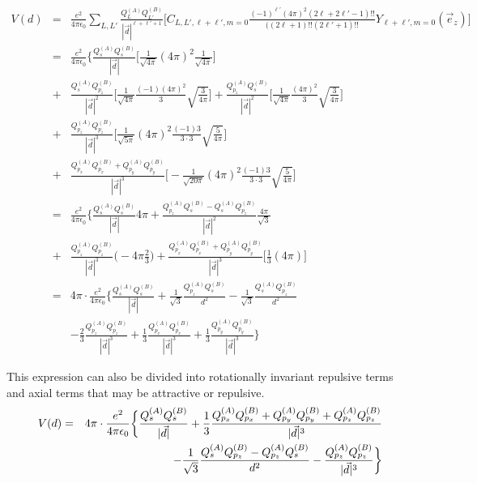\documentclass[11pt,a4paper]{report}
\begin{document}
\begin{eqnarray*}
V(d)&=&
\frac{e^2}{4\pi\epsilon_0} \sum_{L,L'} \frac{ Q_L^{(A)}Q_{L'}^{(B)}}{|\vec{d}|^{\ell+\ell'+1}}
\biggl[C_{L,L',\ell+\ell',m=0}
\frac{(-1)^{\ell'}(4\pi)^2(2\ell+2\ell'-1)!!}{((2\ell+1)!!(2\ell'+1)!!}
Y_{\ell+\ell',m=0}(\vec{e}_z)
\biggr]
\\
&=&
\frac{e^2}{4\pi\epsilon_0}\biggl\lbrace 
\frac{ Q_s^{(A)}Q_{s}^{(B)}}{|\vec{d}|}\biggl[\frac{1}{\sqrt{4\pi}}(4\pi)^2\frac{1}{\sqrt{4\pi}}\biggr]
\\
&+&\frac{ Q_s^{(A)}Q_{p_z}^{(B)}}{|\vec{d}|^{2}}
\biggl[\frac{1}{\sqrt{4\pi}}\frac{(-1)(4\pi)^2}{3}\sqrt{\frac{3}{4\pi}}\biggr]
+\frac{ Q_{p_z}^{(A)}Q_{s}^{(B)}}{|\vec{d}|^{2}}
\biggl[\frac{1}{\sqrt{4\pi}}\frac{(4\pi)^2}{3}\sqrt{\frac{3}{4\pi}}\biggr]
\\
&+&\frac{ Q_{p_z}^{(A)}Q_{p_z}^{(B)}}{|\vec{d}|^3}\biggl[\frac{1}{\sqrt{5\pi}}(4\pi)^2\frac{(-1)3}{3\cdot3}
\sqrt{\frac{5}{4\pi}}\biggr]
\\
&+&\frac{ Q_{p_x}^{(A)}Q_{p_x}^{(B)}+Q_{p_y}^{(A)}Q_{p_y}^{(B)}}{|\vec{d}|^3}
\biggl[-\frac{1}{\sqrt{20\pi}}(4\pi)^2\frac{(-1)3}{3\cdot3}
\sqrt{\frac{5}{4\pi}}\biggr]
\\
&=&
\frac{e^2}{4\pi\epsilon_0}\biggl\lbrace 
\frac{ Q_s^{(A)}Q_{s}^{(B)}}{|\vec{d}|} 4\pi
+\frac{Q_{p_z}^{(A)}Q_{s}^{(B)}- Q_s^{(A)}Q_{p_z}^{(B)}}{|\vec{d}|^{2}}
\frac{4\pi}{\sqrt{3}} 
\\
&+&\frac{ Q_{p_z}^{(A)}Q_{p_z}^{(B)}}{|\vec{d}|^3}\biggl( -4\pi\frac{2}{3}\biggr)
+\frac{ Q_{p_x}^{(A)}Q_{p_x}^{(B)}+Q_{p_y}^{(A)}Q_{p_y}^{(B)}}{|\vec{d}|^3}
\biggl[\frac{1}{3}(4\pi)\biggr]
\\
&=&
4\pi\cdot\frac{e^2}{4\pi\epsilon_0}\biggl\lbrace 
\frac{ Q_s^{(A)}Q_{s}^{(B)}}{|\vec{d}|}
+\frac{1}{\sqrt{3}}\frac{Q_{p_z}^{(A)}Q_{s}^{(B)}}{d^2}- \frac{1}{\sqrt{3}}\frac{Q_s^{(A)}Q_{p_z}^{(B)}}{d^2}
\\
&&-\frac{2}{3}\frac{ Q_{p_z}^{(A)}Q_{p_z}^{(B)}}{|\vec{d}|^3}
+\frac{1}{3}\frac{ Q_{p_x}^{(A)}Q_{p_x}^{(B)}}{|\vec{d}|^3}
+\frac{1}{3}\frac{ Q_{p_y}^{(A)}Q_{p_y}^{(B)}}{|\vec{d}|^3}\biggr\rbrace
\end{eqnarray*}

This expression can also be divided into rotationally invariant
repulsive terms and axial terms that may be attractive or repulsive.
\begin{eqnarray*}
V(d)&=&
4\pi\cdot\frac{e^2}{4\pi\epsilon_0}\biggl\lbrace 
\frac{ Q_s^{(A)}Q_{s}^{(B)}}{|\vec{d}|}+\frac{1}{3}\frac{Q_{p_x}^{(A)}Q_{p_x}^{(B)}+Q_{p_y}^{(A)}Q_{p_y}^{(B)}+Q_{p_z}^{(A)}Q_{p_z}^{(B)}
}{|\vec{d}|^3}
\\
&&\hspace{1.7cm}
-\frac{1}{\sqrt{3}}\frac{Q_s^{(A)}Q_{p_z}^{(B)}-Q_{p_z}^{(A)}Q_{s}^{(B)}}{d^2}
-\frac{ Q_{p_z}^{(A)}Q_{p_z}^{(B)}}{|\vec{d}|^3}
\biggr\rbrace
\end{eqnarray*}
\end{document}
